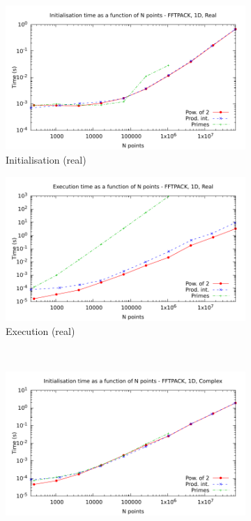 \documentclass[12pt, a4paper]{article} \setlength{\textheight}{24cm}
\begin{document}
\begin{figure}[H]
  \centering
  \begin{subfigure}{.5\textwidth}
    \centering
    \includegraphics[width=.9\linewidth]{graphs/1d-fftpack-init-r.pdf}
    \caption{Initialisation (real)}
    \label{1DFFTPACKRI}
  \end{subfigure}%
  \begin{subfigure}{.5\textwidth}
    \centering
    \includegraphics[width=.9\linewidth]{graphs/1d-fftpack-exec-r.pdf}
    \caption{Execution (real)}
    \label{1DFFTPACKR}
  \end{subfigure}\\
  \begin{subfigure}{.5\textwidth}
    \centering
    \includegraphics[width=.9\linewidth]{graphs/1d-fftpack-init-c.pdf}

\end{subfigure}
\end{figure}
\end{document}
